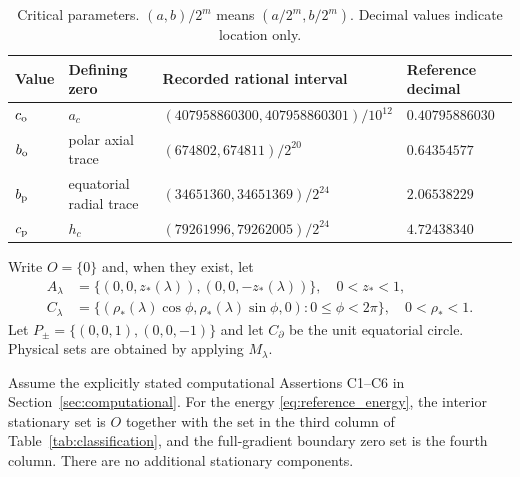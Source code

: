 \begin{table}[htbp]\centering\small
\caption{Critical parameters. $(a,b)/2^m$ means $(a/2^m,b/2^m)$. Decimal values indicate location only.}\label{tab:critical}
\begin{tabular}{@{}llll@{}}\toprule
Value & Defining zero & Recorded rational interval & Reference decimal\\\midrule
$c_{\mathrm o}$ & $a_c$ & $(407958860300,407958860301)/10^{12}$ & $0.40795886030$\\
$b_{\mathrm o}$ & polar axial trace & $(674802,674811)/2^{20}$ & $0.64354577$\\
$b_{\mathrm p}$ & equatorial radial trace & $(34651360,34651369)/2^{24}$ & $2.06538229$\\
$c_{\mathrm p}$ & $h_c$ & $(79261996,79262005)/2^{24}$ & $4.72438340$\\\bottomrule
\end{tabular}
\end{table}

Write $O=\{0\}$ and, when they exist, let
\begin{align}
 A_\lambda&=\{(0,0,z_*(\lambda)),(0,0,-z_*(\lambda))\},\quad 0<z_*<1,\label{eq:axial_set}\\
 C_\lambda&=\{(\rho_*(\lambda)\cos\phi,\rho_*(\lambda)\sin\phi,0):0\le\phi<2\pi\},\quad 0<\rho_*<1.\label{eq:circle_set}
\end{align}
Let $P_\pm=\{(0,0,1),(0,0,-1)\}$ and let $C_\partial$ be the unit equatorial circle. Physical sets are obtained by applying $M_\lambda$.

\begin{theorem}\label{thm:classification}
Assume the explicitly stated computational Assertions C1--C6 in Section~\ref{sec:computational}. For the energy \eqref{eq:reference_energy}, the interior stationary set is $O$ together with the set in the third column of Table~\ref{tab:classification}, and the full-gradient boundary zero set is the fourth column. There are no additional stationary components.
\end{theorem}

